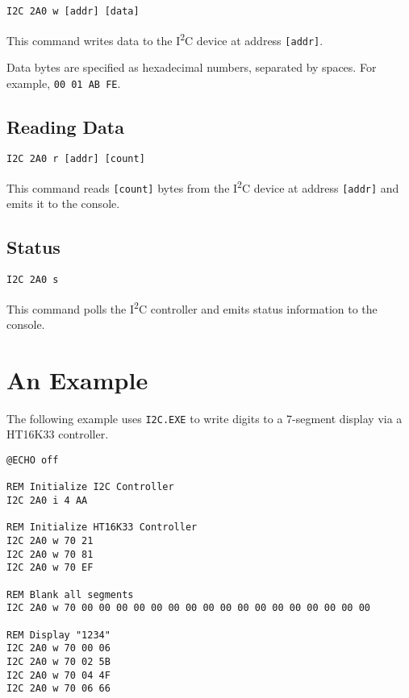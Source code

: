 \documentclass[twoside,10pt,letterpaper]{refart}
\newcommand{\itwoc}{I\textsuperscript{2}C}
\begin{document}
\texttt{I2C 2A0 w [addr] [data]}

This command writes data to the \itwoc{} device at address \texttt{[addr]}.

Data bytes are specified as hexadecimal numbers, separated by spaces. For example, \texttt{00 01 AB FE}.

\subsection*{Reading Data}

\texttt{I2C 2A0 r [addr] [count]}

This command reads \texttt{[count]} bytes from the \itwoc{} device at address \texttt{[addr]} and emits it to the console.

\subsection*{Status}

\texttt{I2C 2A0 s}

This command polls the \itwoc{} controller and emits status information to the console.

\section*{An Example}

The following example uses \texttt{I2C.EXE} to write digits to a 7-segment display via a HT16K33 controller.

\begin{verbatim}
@ECHO off

REM Initialize I2C Controller
I2C 2A0 i 4 AA

REM Initialize HT16K33 Controller
I2C 2A0 w 70 21
I2C 2A0 w 70 81
I2C 2A0 w 70 EF

REM Blank all segments
I2C 2A0 w 70 00 00 00 00 00 00 00 00 00 00 00 00 00 00 00 00 00

REM Display "1234"
I2C 2A0 w 70 00 06
I2C 2A0 w 70 02 5B
I2C 2A0 w 70 04 4F
I2C 2A0 w 70 06 66
\end{verbatim}
\end{document}

